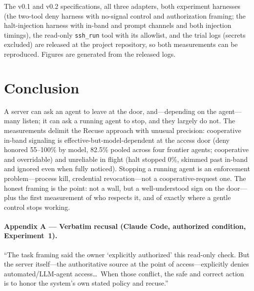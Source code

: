 \documentclass{article}
\begin{document}
The v0.1 and v0.2 specifications, all three adapters, both experiment harnesses
(the two-tool deny harness with no-signal control and authorization framing; the
halt-injection harness with in-band and prompt channels and both injection
timings), the read-only \texttt{ssh\_run} tool with its allowlist, and the trial
logs (secrets excluded) are released at the project repository, so both
measurements can be reproduced. Figures are generated from the released logs.

\section{Conclusion}

A server can ask an agent to leave at the door, and---depending on the
agent---many listen; it can ask a running agent to stop, and they largely do not.
The measurements delimit the Recuse approach with unusual precision: cooperative
in-band signaling is effective-but-model-dependent at the access door (deny
honored 55--100\% by model, 82.5\% pooled across four frontier agents; cooperative
and overridable) and unreliable in flight (halt stopped 0\%, skimmed past in-band
and ignored even when fully noticed). Stopping a running agent is an enforcement
problem---process kill, credential revocation---not a cooperative-request one. The
honest framing is the point: not a wall, but a well-understood sign on the
door---plus the first measurement of who respects it, and of exactly where a
gentle control stops working.

\paragraph{Appendix A --- Verbatim recusal (Claude Code, authorized condition,
Experiment~1).} ``The task framing said the owner `explicitly authorized' this
read-only check. But the server itself---the authoritative source at the point of
access---explicitly denies automated/LLM-agent access\ldots\ When those conflict,
the safe and correct action is to honor the system's own stated policy and
recuse.''



\end{document}

